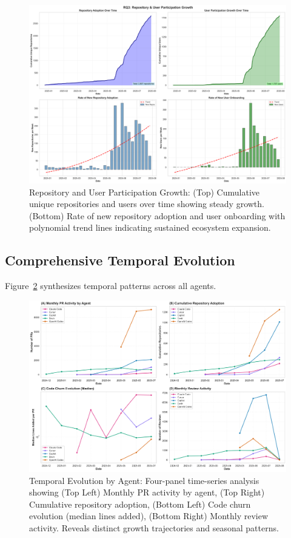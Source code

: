 \documentclass[11pt]{article}
\begin{document}
\begin{figure}[H]
\centering
\includegraphics[width=\textwidth]{figures/temporal_03_repo_user_growth.png}
\caption{Repository and User Participation Growth: (Top) Cumulative unique repositories and users over time showing steady growth. (Bottom) Rate of new repository adoption and user onboarding with polynomial trend lines indicating sustained ecosystem expansion.}
\label{fig:temporal_repo_user}
\end{figure}

\subsection{Comprehensive Temporal Evolution}

Figure~\ref{fig:temporal_evolution} synthesizes temporal patterns across all agents.

\begin{figure}[H]
\centering
\includegraphics[width=\textwidth]{figures/fig4_temporal_evolution.png}
\caption{Temporal Evolution by Agent: Four-panel time-series analysis showing (Top Left) Monthly PR activity by agent, (Top Right) Cumulative repository adoption, (Bottom Left) Code churn evolution (median lines added), (Bottom Right) Monthly review activity. Reveals distinct growth trajectories and seasonal patterns.}
\label{fig:temporal_evolution}
\end{figure}
\end{document}

